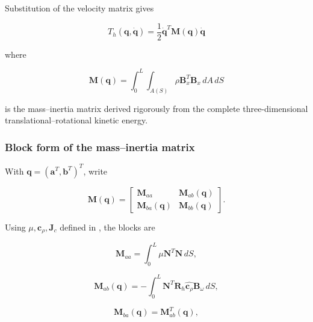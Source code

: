 Substitution of the velocity matrix gives

\begin{equation}
\label{eq:galerkin-2-37}
\boxed{T_{h}\left( \mathbf{q},\dot{\mathbf{q}} \right) = \frac{1}{2}{\dot{\mathbf{q}}}^{T}\mathbf{M}\left( \mathbf{q} \right)\dot{\mathbf{q}}}
\end{equation}

where

\begin{equation}
\label{eq:galerkin-2-38}
\boxed{\mathbf{M}\left( \mathbf{q} \right) = \int_{0}^{L}{\int_{A(S)}^{}\rho}\mathbf{B}_{x}^{T}\mathbf{B}_{x}\, dA\, dS}
\end{equation}

is the mass--inertia matrix derived rigorously from the complete three-dimensional translational--rotational kinetic energy.

\subsubsection{Block form of the mass--inertia matrix}\label{sec:galerkin-2-4-3}

With \(\mathbf{q} = \left( \mathbf{a}^{T},\mathbf{b}^{T} \right)^{T}\), write

\begin{equation}
\label{eq:galerkin-2-39}
\mathbf{M}\left( \mathbf{q} \right) = \begin{bmatrix}
\mathbf{M}_{aa} & \mathbf{M}_{ab}\left( \mathbf{q} \right) \\
\mathbf{M}_{ba}\left( \mathbf{q} \right) & \mathbf{M}_{bb}\left( \mathbf{q} \right)
\end{bmatrix}.
\end{equation}

Using \(\mu,\mathbf{c}_{\rho},\mathbf{J}_{c}\) defined in , the blocks are

\begin{equation}
\label{eq:galerkin-2-40}
\mathbf{M}_{aa} = \int_{0}^{L}\mu\mathbf{N}^{T}\mathbf{N}\, dS,
\end{equation}

\begin{equation}
\label{eq:galerkin-2-41}
\mathbf{M}_{ab}\left( \mathbf{q} \right) = - \int_{0}^{L}\mathbf{N}^{T}\mathbf{R}_{h}\widehat{\mathbf{c}_{\rho}}\mathbf{B}_{\omega}\, dS,
\end{equation}

\begin{equation}
\label{eq:galerkin-2-42}
\mathbf{M}_{ba}\left( \mathbf{q} \right) = \mathbf{M}_{ab}^{T}\left( \mathbf{q} \right),
\end{equation}

